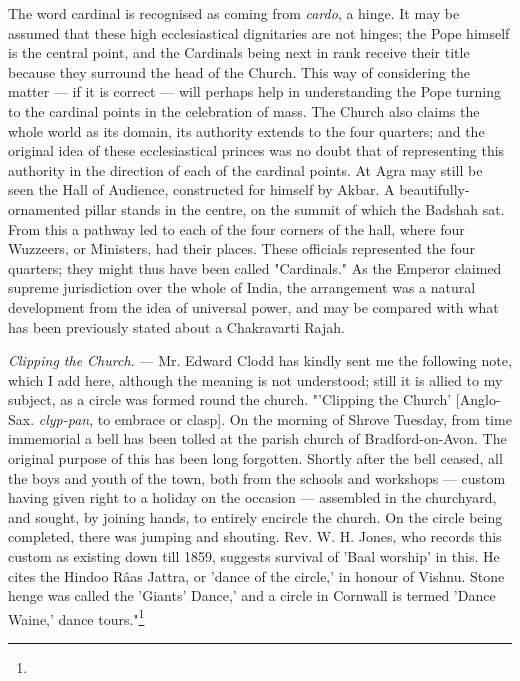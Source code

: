 \documentclass[a4paper, 11pt, oneside, polutonikogreek, english]{article}
\begin{document}
The word cardinal is recognised as coming from \emph{cardo}, a hinge. It may be assumed that these high ecclesiastical dignitaries are not hinges; the Pope himself is the central point, and the Cardinals being next in rank receive their title because they surround the head of the Church. This way of considering the matter --- if it is correct --- will perhaps help in understanding the Pope turning to the cardinal points in the celebration of mass. The Church also claims the whole world as its domain, its authority extends to the four quarters; and the original idea of these ecclesiastical princes was no doubt that of representing this authority in the direction of each of the cardinal points. At Agra may still be seen the Hall of Audience, constructed for himself by Akbar. A beautifully-ornamented pillar stands in the centre, on the summit of which the Badshah sat. From this a pathway led to each of the four corners of the hall, where four Wuzzeers, or Ministers, had their places. These officials represented the four quarters; they might thus have been called "Cardinals." As the Emperor claimed supreme jurisdiction over the whole of India, the arrangement was a natural development from the idea of universal power, and may be compared with what has been previously stated about a Chakravarti Rajah.

\emph{Clipping the Church.} --- Mr. Edward Clodd has kindly sent me the following note, which I add here, although the meaning is not understood; still it is allied to my subject, as a circle was formed round the church. "'Clipping the Church' [Anglo-Sax. \emph{clyp-pan}, to embrace or clasp]. On the morning of Shrove Tuesday, from time immemorial a bell has been tolled at the parish church of Bradford-on-Avon. The original purpose of this has been long forgotten. Shortly after the bell ceased, all the boys and youth of the town, both from the schools and workshops --- custom having given right to a holiday on the occasion --- assembled in the churchyard, and sought, by joining hands, to entirely encircle the church. On the circle being completed, there was jumping and shouting. Rev. W. H. Jones, who records this custom as existing down till 1859, suggests survival of 'Baal worship' in this. He cites the Hindoo Râas Jattra, or 'dance of the circle,' in honour of Vishnu. Stone henge was called the 'Giants' Dance,' and a circle in Cornwall is termed 'Dance Waine,' dance tours."\footnote{}
\end{document}
